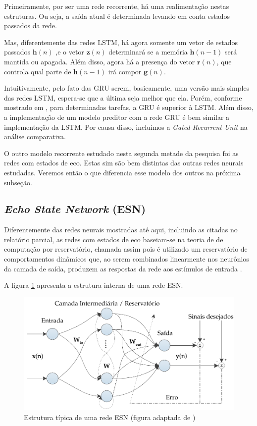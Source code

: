 \documentclass[a4paper, 12pt]{article}
\begin{document}
Primeiramente, por ser uma rede recorrente, há uma realimentação nestas estruturas. Ou seja, a saída atual é determinada levando em conta estados passados da rede.

Mas, diferentemente das redes LSTM, há agora somente um vetor de estados passados $\mathbf{h}(n)$ ,e o vetor $\mathbf{z}(n)$ determinará se a memória $\mathbf{h}(n-1)$ será mantida ou apagada. Além disso, agora há a presença do vetor $\mathbf{r}(n)$, que controla qual parte de $\mathbf{h}(n-1)$ irá compor $\mathbf{g}(n)$. 

Intuitivamente, pelo fato das GRU serem, basicamente, uma versão mais simples das redes LSTM, espera-se que a última seja melhor que ela. Porém, conforme mostrado em \cite{cho2014learning}, para determinadas tarefas, a GRU é superior à LSTM. Além disso, a implementação de um modelo preditor com a rede GRU é bem similar a implementação da LSTM. Por causa disso, incluímos a \textit{Gated Recurrent Unit} na análise comparativa. 

O outro modelo recorrente estudado nesta segunda metade da pesquisa foi as redes com estados de eco. Estas sim são bem distintas das outras redes neurais estudadas. Veremos então o que diferencia esse modelo dos outros na próxima subseção.

\subsection{\textit{Echo State Network} (ESN)}

Diferentemente das redes neurais mostradas até aqui, incluindo as citadas no relatório parcial, as redes com estados de eco baseiam-se na teoria de de computação por reservatório, chamada assim pois é utilizado um reservatório de comportamentos dinâmicos que, ao serem combinados linearmente nos neurônios da camada de saída, produzem as respostas da rede aos estímulos de entrada \cite{boccato2013novas}. 

A figura \ref{fig:esn-model} apresenta a estrutura interna de uma rede ESN.
\begin{figure}[H]
\centering
\includegraphics[scale = 0.8]{esn-network.pdf}
\caption{Estrutura típica de uma rede ESN (figura adaptada de \cite{boccato2013novas}) }
\label{fig:esn-model}
\end{figure}
\end{document}
